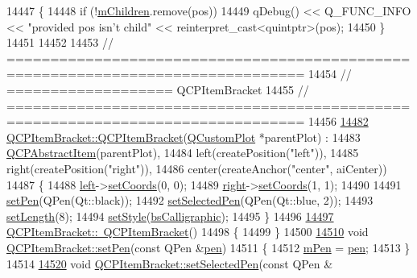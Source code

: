 \begin{DoxyCode}
14447 \{
14448   \textcolor{keywordflow}{if} (!\hyperlink{a00032_a5f0e67f395a63e2dd0e29ff1dcaf37b7}{mChildren}.remove(pos))
14449     qDebug() << Q\_FUNC\_INFO << \textcolor{stringliteral}{"provided pos isn't child"} << \textcolor{keyword}{reinterpret\_cast<}quintptr\textcolor{keyword}{>}(pos);
14450 \}
14451 
14452 
14453 \textcolor{comment}{// ================================================================================}
14454 \textcolor{comment}{// =================== QCPItemBracket}
14455 \textcolor{comment}{// ================================================================================}
14456 
\hypertarget{a00115_source_l14482}{}\hyperlink{a00033_a44ecfa37a76de5e3549e2d61f9d8ee56}{14482} \hyperlink{a00033_a44ecfa37a76de5e3549e2d61f9d8ee56}{QCPItemBracket::QCPItemBracket}(\hyperlink{a00030_d8/d00/a00186}{QCustomPlot} *parentPlot) :
14483   \hyperlink{a00022}{QCPAbstractItem}(parentPlot),
14484   left(createPosition(\textcolor{stringliteral}{"left"})),
14485   right(createPosition(\textcolor{stringliteral}{"right"})),
14486   center(createAnchor(\textcolor{stringliteral}{"center"}, aiCenter))
14487 \{
14488   \hyperlink{a00033_af6cc6d27d96171778c6927d6edce48b0}{left}->\hyperlink{a00038_aa988ba4e87ab684c9021017dcaba945f}{setCoords}(0, 0);
14489   \hyperlink{a00033_afa6c1360b05a50c4e0df37b3cebab6be}{right}->\hyperlink{a00038_aa988ba4e87ab684c9021017dcaba945f}{setCoords}(1, 1);
14490   
14491   \hyperlink{a00033_ab13001d9cc5d8f9e56ea15bdda682acb}{setPen}(QPen(Qt::black));
14492   \hyperlink{a00033_a349785c31122778a520c64891fa204c5}{setSelectedPen}(QPen(Qt::blue, 2));
14493   \hyperlink{a00033_ac7cfc3da7da9b5c5ac5dfbe4f0351b2a}{setLength}(8);
14494   \hyperlink{a00033_a612dffa2373422eef8754d690add3703}{setStyle}(\hyperlink{a00033_a7ac3afd0b24a607054e7212047d59dbda8f29f5ef754e2dc9a9efdedb2face0f3}{bsCalligraphic});
14495 \}
14496 
\hypertarget{a00115_source_l14497}{}\hyperlink{a00033_ad773c3e8e09868d6f8caeb92c54919f4}{14497} \hyperlink{a00033_ad773c3e8e09868d6f8caeb92c54919f4}{QCPItemBracket::~QCPItemBracket}()
14498 \{
14499 \}
14500 
\hypertarget{a00115_source_l14510}{}\hyperlink{a00033_ab13001d9cc5d8f9e56ea15bdda682acb}{14510} \textcolor{keywordtype}{void} \hyperlink{a00033_ab13001d9cc5d8f9e56ea15bdda682acb}{QCPItemBracket::setPen}(\textcolor{keyword}{const} QPen &\hyperlink{a00116_a1f13fffa0a0faac34ec342973e613a4a}{pen})
14511 \{
14512   \hyperlink{a00033_a350c864a5853b04343719f5a8be6b675}{mPen} = \hyperlink{a00033_a8963ff4a232b649c83d2461fd3c30d39}{pen};
14513 \}
14514 
\hypertarget{a00115_source_l14520}{}\hyperlink{a00033_a349785c31122778a520c64891fa204c5}{14520} \textcolor{keywordtype}{void} \hyperlink{a00033_a349785c31122778a520c64891fa204c5}{QCPItemBracket::setSelectedPen}(\textcolor{keyword}{const} QPen &

\end{DoxyCode}
